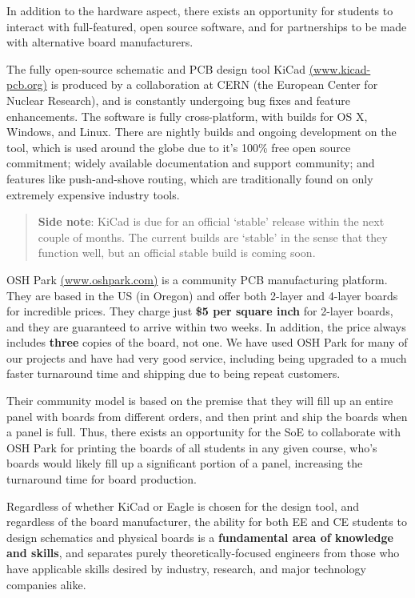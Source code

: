 \documentclass[12pt]{article}
\numberwithin{figure}{section}
\numberwithin{equation}{section}
\begin{document}
{In addition to the hardware aspect, there exists an opportunity for
students to interact with full-featured, open source software, and for
partnerships to be made with alternative board manufacturers.

\bigskip

The fully open-source schematic and PCB design tool KiCad
\href{www.kicad-pcb.org}{(www.kicad-pcb.org)} is produced by a
collaboration at CERN (the European Center for Nuclear Research), and is
constantly undergoing bug fixes and feature enhancements. The software
is fully cross-platform, with builds for OS X, Windows, and Linux. There
are nightly builds and ongoing development on the tool, which is used
around the globe due to it's 100\% free open source commitment; widely
available documentation and support community; and features like
push-and-shove routing, which are traditionally found on only extremely
expensive industry tools.

\begin{quote}
\textbf{Side note}: KiCad is due for an official `stable' release within
the next couple of months. The current builds are `stable' in the sense
that they function well, but an official stable build is coming soon.
\end{quote}

OSH Park \href{www.oshpark.com}{(www.oshpark.com)} is a community PCB
manufacturing platform. They are based in the US (in Oregon) and offer
both 2-layer and 4-layer boards for incredible prices. They charge just
\textbf{\$5 per square inch} for 2-layer boards, and they are guaranteed
to arrive within two weeks. In addition, the price always includes
\textbf{three} copies of the board, not one. We have used OSH Park for
many of our projects and have had very good service, including being
upgraded to a much faster turnaround time and shipping due to being
repeat customers.

\bigskip

Their community model is based on the premise that they will fill up an
entire panel with boards from different orders, and then print and ship
the boards when a panel is full. Thus, there exists an opportunity for
the SoE to collaborate with OSH Park for printing the boards of all
students in any given course, who's boards would likely fill up a
significant portion of a panel, increasing the turnaround time for board
production.

\bigskip

Regardless of whether KiCad or Eagle is chosen for the design tool, and
regardless of the board manufacturer, the ability for both EE and CE
students to design schematics and physical boards is a
\textbf{fundamental area of knowledge and skills}, and separates purely
theoretically-focused engineers from those who have applicable skills
desired by industry, research, and major technology companies alike.

}
\end{document}
